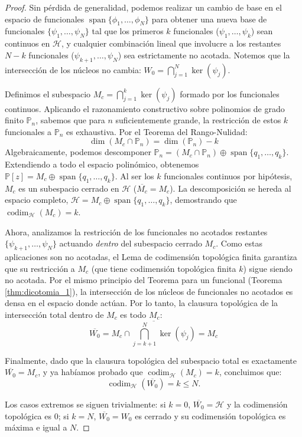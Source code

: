 \documentclass[12pt,a4paper]{article}
\theoremstyle{definition}
\theoremstyle{remark}
\newcommand{\Poly}{\mathbb{P}[z]}
\begin{document}
\begin{proof}
  Sin pérdida de generalidad, podemos realizar un cambio de base en el espacio de funcionales $\operatorname{span}\{\phi_1, \dots, \phi_N\}$ para obtener una nueva base de funcionales $\{\psi_1, \dots, \psi_N\}$ tal que los primeros $k$ funcionales ($\psi_1, \dots, \psi_k$) sean continuos en $\mathcal{H}$, y cualquier combinación lineal que involucre a los restantes $N-k$ funcionales ($\psi_{k+1}, \dots, \psi_N$) sea estrictamente no acotada. Notemos que la intersección de los núcleos no cambia: $W_0 = \bigcap_{j=1}^N \ker(\psi_j)$.

  Definimos el subespacio $M_c = \bigcap_{j=1}^k \ker(\psi_j)$ formado por los funcionales continuos.
  Aplicando el razonamiento constructivo sobre polinomios de grado finito $\mathbb{P}_n$, sabemos que para $n$ suficientemente grande, la restricción de estos $k$ funcionales a $\mathbb{P}_n$ es exhaustiva. Por el Teorema del Rango-Nulidad:
  $$ \dim(M_c \cap \mathbb{P}_n) = \dim(\mathbb{P}_n) - k $$
  Algebraicamente, podemos descomponer $\mathbb{P}_n = (M_c \cap \mathbb{P}_n) \oplus \operatorname{span}\{q_1, \dots, q_k\}$. Extendiendo a todo el espacio polinómico, obtenemos $\Poly = M_c \oplus \operatorname{span}\{q_1, \dots, q_k\}$.
  Al ser los $k$ funcionales continuos por hipótesis, $M_c$ es un subespacio cerrado en $\mathcal{H}$ ($\overline{M_c} = M_c$). La descomposición se hereda al espacio completo, $\mathcal{H} = M_c \oplus \operatorname{span}\{q_1, \dots, q_k\}$, demostrando que $\operatorname{codim}_\mathcal{H}(M_c) = k$.

  Ahora, analizamos la restricción de los funcionales no acotados restantes $\{\psi_{k+1}, \dots, \psi_N\}$ actuando \textit{dentro} del subespacio cerrado $M_c$.
  Como estas aplicaciones son no acotadas, el Lema de codimensión topológica finita garantiza que su restricción a $M_c$ (que tiene codimensión topológica finita $k$) sigue siendo no acotada.
  Por el mismo principio del Teorema para un funcional (Teorema \ref{thm:dicotomia_1}), la intersección de los núcleos de funcionales no acotados es densa en el espacio donde actúan.
  Por lo tanto, la clausura topológica de la intersección total dentro de $M_c$ es todo $M_c$:
  $$ \overline{W_0} = \overline{M_c \cap \bigcap_{j=k+1}^N \ker(\psi_j)} = M_c $$

  Finalmente, dado que la clausura topológica del subespacio total es exactamente $\overline{W_0} = M_c$, y ya habíamos probado que $\operatorname{codim}_\mathcal{H}(M_c) = k$, concluimos que:
  $$ \operatorname{codim}_\mathcal{H}(\overline{W_0}) = k \le N. $$

  Los casos extremos se siguen trivialmente: si $k=0$, $\overline{W_0} = \mathcal{H}$ y la codimensión topológica es 0; si $k=N$, $\overline{W_0} = W_0$ es cerrado y su codimensión topológica es máxima e igual a $N$.
\end{proof}
\end{document}

